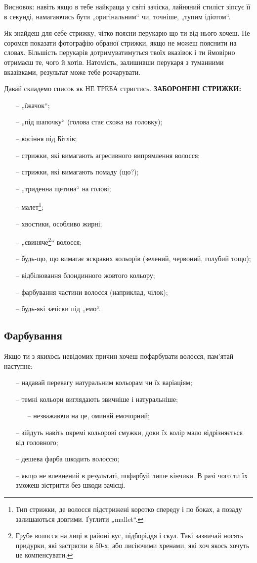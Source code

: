 Висновок: навіть якщо в тебе найкраща у світі зачіска, лайняний стиліст зіпсує
її в секунді, намагаючись бути „оригінальним“ чи, точніше, „тупим ідіотом“.

Як знайдеш для себе стрижку, чітко поясни перукарю що ти від нього хочеш. Не
соромся показати фотографію обраної стрижки, якщо не можеш пояснити на словах.
Більшість перукарів дотримуватимуться твоїх вказівок і ти ймовірно отримаєш те,
чого й хотів. Натомість, залишивши перукаря з туманними вказівками, результат
може тебе розчарувати.

Давай складемо список як НЕ ТРЕБА стригтись. \textbf{ЗАБОРОНЕНІ СТРИЖКИ:}
\begin{itemize}
	\item[--] „їжачок“;
	\item[--] „під шапочку“ (голова стає схожа на головку);
	\item[--] косіння під Бітлів;
	\item[--] стрижки, які вимагають агресивного випрямлення волосся;
	\item[--] стрижки, які вимагають помаду (що?);
	\item[--] „триденна щетина“ на голові;
	\item[--] малет\footnote{Тип стрижки, де волосся підстрижені коротко
	спереду і по боках, а позаду залишаються довгими. Ґуґлити „mallet“.};
	\item[--] хвостики, особливо жирні;
	\item[--] „свиняче\footnote{Грубе волосся на лиці в районі вус, підборіддя
	і скул. Такі зазвичай носять придурки, які застрягли в 50-х, або лисіючими
	хренами, які хоч якось хочуть це компенсувати.}“ волосся;
	\item[--] будь-що, що вимагає яскравих кольорів (зелений, червоний, голубий
	тощо);
	\item[--] відбілювання блондинного жовтого кольору;
	\item[--] фарбування частини волосся (наприклад, чілок);
	\item[--] будь-які зачіски під „емо“.
\end{itemize}

\subsection{Фарбування}
Якщо ти з якихось невідомих причин хочеш пофарбувати волосся, пам’ятай
наступне:
\begin{itemize}
	\item[--] надавай перевагу натуральним кольорам чи їх варіаціям;
	\item[--] темні кольори виглядають звичніше і натуральніше;
	\begin{itemize}
		\item[--] незважаючи на це, оминай емочорний;
	\end{itemize}
	\item[--] зійдуть навіть окремі кольорові смужки, доки їх колір мало
	відрізняється від головного;
	\item[--] дешева фарба шкодить волоссю;
	\item[--] якщо не впевнений в результаті, пофарбуй лише кінчики. В разі
	чого ти їх зможеш зістригти без шкоди зачісці.
\end{itemize}